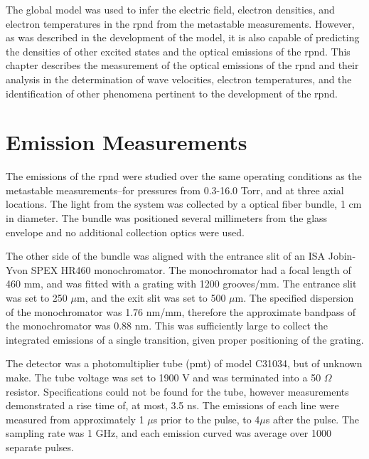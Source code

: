The global model was used to infer the electric field, electron densities, and
electron temperatures in the \acs{rpnd} from the metastable measurements.
However, as was described in the development of the model, it is also capable of
predicting the densities of other excited states and the optical emissions of
the \acs{rpnd}. This chapter describes the measurement of the optical emissions
of the \acs{rpnd} and their analysis in the determination of wave velocities,
electron temperatures, and the identification of other phenomena pertinent to
the development of the \acs{rpnd}.

\section{Emission Measurements}

The emissions of the \acs{rpnd} were studied over the same operating conditions
as the metastable measurements--for pressures from 0.3-16.0 Torr, and at three
axial locations. The light from the system was collected by a optical fiber
bundle, 1 cm in diameter. The bundle was positioned several millimeters from the
glass envelope and no additional collection optics were used.

The other side of the bundle was aligned with the entrance slit of an ISA
Jobin-Yvon SPEX HR460 monochromator. The monochromator had a focal length of 460
mm, and was fitted with a grating with 1200 grooves/mm. The entrance slit was
set to 250 $\mu$m, and the exit slit was set to 500 $\mu$m. The specified
dispersion of the monochromator was 1.76 nm/mm, therefore the approximate
bandpass of the monochromator was 0.88 nm. This was sufficiently large to
collect the integrated emissions of a single transition, given proper
positioning of the grating.

The detector was a photomultiplier tube (\acs{pmt}) of model C31034, but of
unknown make. The tube voltage was set to 1900 V and was terminated into a 50
$\Omega$ resistor. Specifications could not be found for the tube, however
measurements demonstrated a rise time of, at most, 3.5 ns. The emissions of each
line were measured from approximately 1 $\mu$s prior to the pulse, to 4$\mu$s
after the pulse. The sampling rate was 1 GHz, and each emission curved was
average over 1000 separate pulses.


